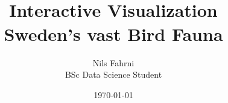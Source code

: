 \documentclass[10pt]{report}
\title{
    \bfseries
    \includegraphicsrounded{figures/birds_of_sweden.png}{12cm}{10cm} \\
    \vspace{1cm}
    \large{Interactive Visualization} \\
    \LARGE{Sweden's vast Bird Fauna} \\
}
\author{
    Nils Fahrni \\
    \small{BSc Data Science Student}
    }
\date{\today}
\begin{document}
\maketitle

\tableofcontents








\sloppy  %
\printbibliography
\end{document}
